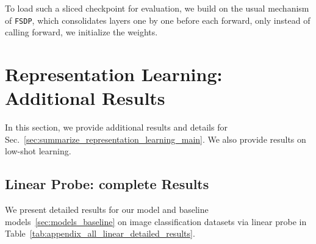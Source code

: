 \documentclass[10pt,twocolumn,letterpaper]{article}
\begin{document}
To load such a sliced checkpoint for evaluation, we build on the usual mechanism of \texttt{FSDP}, which consolidates layers one by one before each forward, only instead of calling forward, we initialize the weights. 




\section{Representation Learning: Additional Results}
\label{sec:appendix_reprensentation_learning}

In this section, we provide additional results and details for Sec.~\ref{sec:summarize_representation_learning_main}. We also provide results on low-shot learning.

\subsection{Linear Probe: complete Results}
We present detailed results for our model and baseline models~\ref{sec:models_baseline} on image classification datasets  via linear probe in Table~\ref{tab:appendix_all_linear_detailed_results}.
\end{document}
